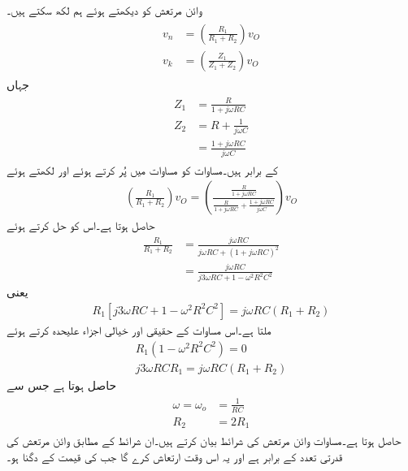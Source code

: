 وائن مرتعش کو دیکھتے ہوئے ہم لکھ سکتے ہیں۔
\begin{gather}
\begin{aligned}\label{مساوات_وائن_مرتعش_برقی_دباو}
v_n&=\left(\frac{R_1}{R_1+R_2}\right) v_O\\
v_k&=\left(\frac{Z_1}{Z_1+Z_2}\right) v_O
\end{aligned}
\end{gather} 
جہاں
\begin{gather}
\begin{aligned}\label{مساوات_وائن_مرتعش_مقاومت}
Z_1&=\frac{R}{1+j \omega R C}\\
Z_2&=R+\frac{1}{j \omega C}\\
&=\frac{1+j \omega R C}{j \omega C}
\end{aligned}
\end{gather}
کے برابر ہیں۔مساوات  کو مساوات  میں پُر کرتے ہوئے اور  لکھتے ہوئے
\begin{align*}
\left(\frac{R_1}{R_1+R_2}\right) v_O=\left(\frac{\frac{R}{1+j \omega R C}}{\frac{R}{1+j \omega R C}+\frac{1+j \omega R C}{j \omega C}}\right) v_O
\end{align*}
حاصل ہوتا ہے۔اس کو حل کرتے ہوئے
\begin{align*}
\frac{R_1}{R_1+R_2}&=\frac{j \omega R C}{j \omega R C +\left(1+j \omega R C \right)^2}\\
&=\frac{j \omega R C}{j 3 \omega R C +1-\omega^2 R^2 C^2}
\end{align*}
یعنی
\begin{align}
R_1 \left[j 3 \omega R C +1-\omega^2 R^2 C^2 \right]=j \omega R C\left(R_1+R_2 \right)
\end{align}
ملتا ہے۔اس مساوات کے حقیقی اور خیالی اجزاء علیحدہ کرتے ہوئے
\begin{align*}
R_1\left(1-\omega^2 R^2 C^2 \right)=0\\
j 3 \omega R C R_1=j\omega R C \left(R_1+R_2 \right)
\end{align*}
حاصل ہوتا ہے جس سے
\begin{gather}
\begin{aligned}\label{مساوات_وائن_مرتعش_تخلیقی_مساوات}
\omega=\omega_o &=\frac{1}{R C}\\
R_2&=2R_1
\end{aligned}
\end{gather} 
حاصل ہوتا ہے۔مساوات  وائن مرتعش کی شرائط بیان کرتے ہیں۔ان شرائط کے مطابق وائن مرتعش کی قدرتی تعدد  کے برابر ہے اور یہ اس وقت ارتعاش کرے گا جب  کی قیمت  کے دگنا ہو۔

